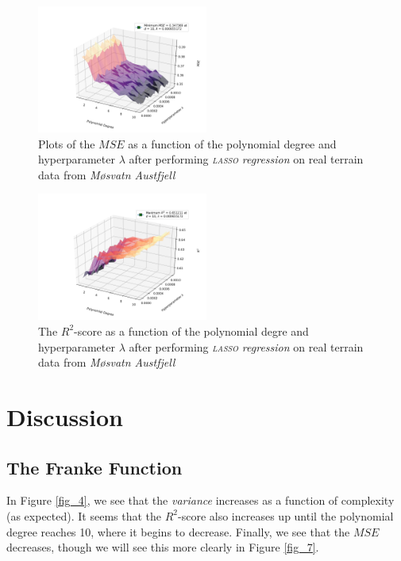 \documentclass[a4paper,10pt,english]{article}
\begin{document}
\begin{figure}[H]
	\centering 
	\includegraphics[width = 0.5\textwidth, center]{../real_output/part_E_2.png}
	\caption{Plots of the $MSE$ as a function of the polynomial degree and hyperparameter $\lambda$ after performing \textit{\textsc{lasso} regression} on real terrain data from \textit{Møsvatn Austfjell}}
	\label{fig_23}
\end{figure}

\begin{figure}[H]
	\centering 
	\includegraphics[width = 0.5\textwidth, center]{../real_output/part_E_3.png}
	\caption{The $R^2$-score as a function of the polynomial degre and hyperparameter $\lambda$ after performing \textit{\textsc{lasso} regression} on real terrain data from \textit{Møsvatn Austfjell}}
	\label{fig_24}
\end{figure}

\section*{Discussion}
\label{sec:discussion}

\subsection*{The Franke Function}

In Figure \ref{fig_4}, we see that the \textit{variance} increases as a function of complexity (as expected). It seems that the $R^2$-score also increases up until the polynomial degree reaches 10, where it begins to decrease.  Finally, we see that the $MSE$ decreases, though we will see this more clearly in Figure \ref{fig_7}.
 
\end{document}
